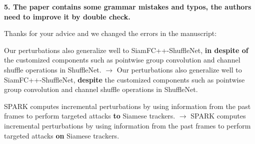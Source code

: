 \documentclass{article}
\begin{document}
\noindent \textbf{5. The paper contains some grammar mistakes and typos, the authors need to improve it by double check.}

Thanks for your advice and we changed the errors in the manuscript:

Our perturbations also generalize well to SiamFC++-ShuffleNet, \textbf{in despite of} the customized components such as pointwise group convolution and channel shuffle operations in ShuffleNet. $\rightarrow$ Our perturbations also generalize well to SiamFC++-ShuffleNet, \textbf{despite} the customized components such as pointwise group convolution and channel shuffle operations in ShuffleNet.

SPARK computes incremental perturbations by using information from the past frames to perform targeted attacks \textbf{to} Siamese trackers. $\rightarrow$ SPARK computes incremental perturbations by using information from the past frames to perform targeted attacks \textbf{on} Siamese trackers.



\end{document}
